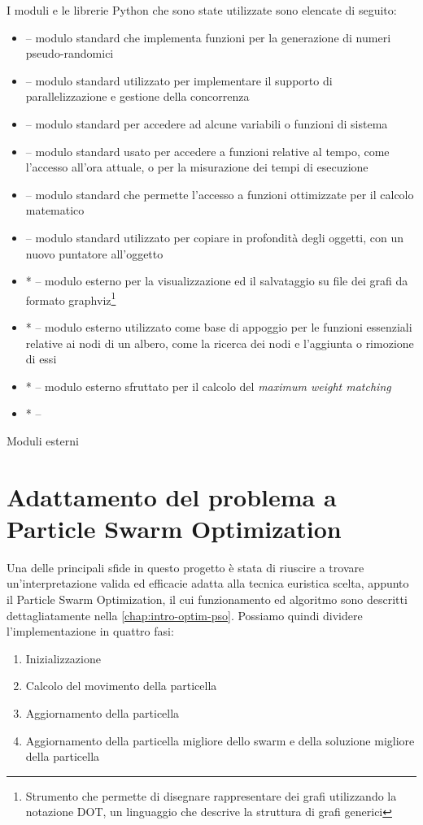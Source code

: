 I moduli e le librerie Python che sono state utilizzate sono elencate di seguito: \begin{itemize}
  \item {} -- modulo standard che implementa funzioni per la generazione di numeri pseudo-randomici
  \item {} -- modulo standard utilizzato per implementare il supporto di parallelizzazione e gestione della concorrenza
  \item {} -- modulo standard per accedere ad alcune variabili o funzioni di sistema
  \item {} -- modulo standard usato per accedere a funzioni relative al tempo, come l'accesso all'ora attuale, o per la misurazione dei tempi di esecuzione
  \item {} -- modulo standard che permette l'accesso a funzioni ottimizzate per il calcolo matematico
  \item {} -- modulo standard utilizzato per copiare in profondità degli oggetti, con un nuovo puntatore all'oggetto
  \item *  -- modulo esterno per la visualizzazione ed il salvataggio su file dei grafi da formato graphviz\footnote{Strumento che permette di disegnare rappresentare dei grafi utilizzando la notazione DOT, un linguaggio che descrive la struttura di grafi generici}
  \item *  -- modulo esterno utilizzato come base di appoggio per le funzioni essenziali relative ai nodi di un albero, come la ricerca dei nodi e l'aggiunta o rimozione di essi
  \item *  -- modulo esterno sfruttato per il calcolo del \textit{maximum weight matching}
  \item *  -- 
\end{itemize}

\small * Moduli esterni


\section{Adattamento del problema a Particle Swarm Optimization}
\label{chap:pso-adapt}
Una delle principali sfide in questo progetto è stata di riuscire a trovare un'interpretazione valida ed efficacie adatta alla tecnica euristica scelta, appunto il Particle Swarm Optimization, il cui funzionamento ed algoritmo sono descritti dettagliatamente nella \autoref{chap:intro-optim-pso}. Possiamo quindi dividere l'implementazione in quattro fasi: \begin{enumerate}
  \item Inizializzazione
  \item Calcolo del movimento della particella
  \item Aggiornamento della particella
  \item Aggiornamento della particella migliore dello swarm e della soluzione migliore della particella
\end{enumerate}

